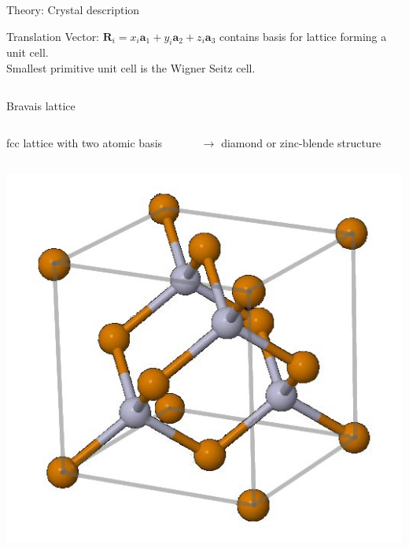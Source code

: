 \begin{frame}{Theory: Crystal description}

	\begin{block}{Translation Vector: $\boldsymbol{R}_i = x_i \boldsymbol{a}_1 + y_i \boldsymbol{a}_2 + z_i \boldsymbol{a}_3$}
		contains basis for lattice forming a unit cell. \\
		Smallest primitive unit cell is the Wigner Seitz cell.
	\end{block}
	\begin{columns}
		\begin{column}{0.3\linewidth}
			Bravais lattice  
		\end{column}
	\end{columns}
	\begin{columns}
		\begin{column}{0.5\linewidth}
			fcc lattice with two atomic basis 
		\end{column}
		\hspace{-1cm}
		\begin{column}{0.55\linewidth}
			$\rightarrow$ diamond or zinc-blende structure 
		\end{column}
	\end{columns}
	\begin{columns}
		\begin{column}{.25\linewidth}
			\centering
			\includegraphics[width=\linewidth]{andere_bilder/zinc_blende}

\end{column}
\end{columns}
\end{frame}
